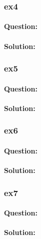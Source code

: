 \documentclass[a4paper,12pt,titlepage]{article} %
\begin{document}
\subsubsection{ex4}
\paragraph{Question:}

\paragraph{Solution:}

\subsubsection{ex5}
\paragraph{Question:}

\paragraph{Solution:}

\subsubsection{ex6}
\paragraph{Question:}

\paragraph{Solution:}

\subsubsection{ex7}
\paragraph{Question:}

\paragraph{Solution:}


\end{document}

